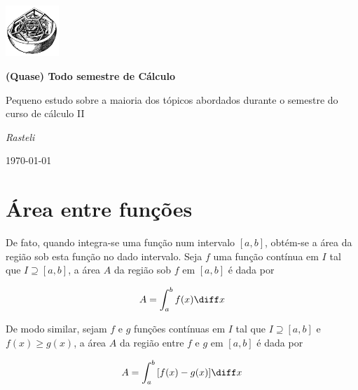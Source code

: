 \documentclass[a4paper, 12pt]{extreport}
\title{\doctitle}
\author{\docauthor}
\def\doctitle{(Quase) Todo semestre de Cálculo}
\def\docauthor{Rasteli}
\begin{document}

  \begin{titlepage}
	  \centering
    \includegraphics[width=0.15\textwidth]{geoart}\par\vspace{1cm}
	  \vspace{1.5cm}
	  {\huge\bfseries \doctitle\par}
	  \vspace{1cm}
    {\Large {Pequeno estudo sobre a maioria dos tópicos abordados durante o semestre do curso de cálculo II}\par}
	  \vspace{1cm}
	  {\Large\itshape \docauthor\par}

	  \vfill

	  {\large \today\par}
  \end{titlepage}
  \tableofcontents

  \newpage

  \chapter{Área entre funções}
    De fato, quando integra-se uma função num intervalo $ [a, b] $, obtém-se a área da região sob esta função no dado intervalo.
    Seja $ f $ uma função contínua em $ I $ tal que $ I \supseteq [a, b] $, a área $ A $ da região sob $ f $ em $ [a, b] $ é dada por

    \begin{equation}
      A = \int_a^b{f(x)}\diff x
    \end{equation}

    De modo similar, sejam $ f $ e $ g $ funções contínuas em $ I $ tal que $ I \supseteq [a, b] $ e $ f(x) \geqslant g(x) $, a área $ A $ da região entre
    $ f $ e $ g $ em $ [a, b] $ é dada por

    \begin{equation}
      A = \int_a^b{[f(x) - g(x)]}\diff x
    \end{equation}
\end{document}
